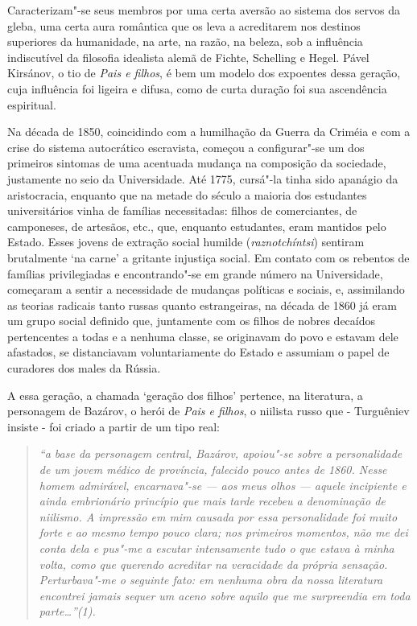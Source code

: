 Caracterizam"-se seus membros por uma certa aversão ao sistema dos servos
da gleba, uma certa aura romântica que os leva a acreditarem nos
destinos superiores da humanidade, na arte, na razão, na beleza, sob a
influência indiscutível da filosofia idealista alemã de Fichte,
Schelling e Hegel. Pável Kirsánov, o tio de \emph{Pais e filhos}, é bem
um modelo dos expoentes dessa geração, cuja influência foi ligeira e
difusa, como de curta duração foi sua ascendência espiritual.

Na década de 1850, coincidindo com a humilhação da Guerra da Criméia e
com a crise do sistema autocrático escravista, começou a configurar"-se
um dos primeiros sintomas de uma acentuada mudança na composição da
sociedade, justamente no seio da Universidade. Até 1775, cursá"-la tinha
sido apanágio da aristocracia, enquanto que na metade do século  a
maioria dos estudantes universitários vinha de famílias necessitadas:
filhos de comerciantes, de camponeses, de artesãos, etc., que, enquanto
estudantes, eram mantidos pelo Estado. Esses jovens de extração social
humilde (\emph{raznotchíntsi}) sentiram brutalmente `na carne' a
gritante injustiça social. Em contato com os rebentos de famílias
privilegiadas e encontrando"-se em grande número na Universidade,
começaram a sentir a necessidade de mudanças políticas e sociais, e,
assimilando as teorias radicais tanto russas quanto estrangeiras, na
década de 1860 já eram um grupo social definido que, juntamente com os
filhos de nobres decaídos pertencentes a todas e a nenhuma classe, se
originavam do povo e estavam dele afastados, se distanciavam
voluntariamente do Estado e assumiam o papel de curadores dos males da
Rússia.

A essa geração, a chamada `geração dos filhos' pertence, na literatura,
a personagem de Bazárov, o herói de \emph{Pais e filhos}, o niilista
russo que - Turguêniev insiste - foi criado a partir de um tipo real:

\begin{quote}
\emph{``a base da personagem central, Bazárov, apoiou"-se sobre a
personalidade de um jovem médico de província, falecido pouco antes de
1860. Nesse homem admirável, encarnava"-se --- aos meus olhos --- aquele
incipiente e ainda embrionário princípio que mais tarde recebeu a
denominação de niilismo. A impressão em mim causada por essa
personalidade foi muito forte e ao mesmo tempo pouco clara; nos
primeiros momentos, não me dei conta dela e pus"-me a escutar
intensamente tudo o que estava à minha volta, como que querendo
acreditar na veracidade da própria sensação. Perturbava"-me o seguinte
fato: em nenhuma obra da nossa literatura encontrei jamais sequer um
aceno sobre aquilo que me surpreendia em toda parte\ldots{}''(1).}
\end{quote}

